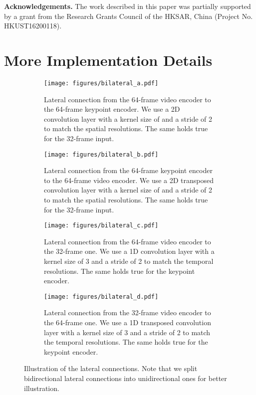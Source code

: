 \documentclass[10pt,twocolumn,letterpaper]{article}
\begin{document}
\small\noindent \textbf{Acknowledgements.}
The work described in this paper was partially supported by a grant from the Research Grants Council of the HKSAR, China (Project No. HKUST16200118). 
{\small


}

\appendix
\section{More Implementation Details}
\begin{figure*}[t]
    \centering
    \begin{subfigure}[b]{0.45\textwidth}
     \centering
     \texttt{[image: figures/bilateral\_a.pdf]}
     \caption{Lateral connection from the 64-frame video encoder to the 64-frame keypoint encoder. We use a 2D convolution layer with a kernel size of  and a stride of 2 to match the spatial resolutions. The same holds true for the 32-frame input.}
     \label{fig:bilat_A}
    \end{subfigure}
    \quad\quad
    \begin{subfigure}[b]{0.45\textwidth}
     \centering
     \texttt{[image: figures/bilateral\_b.pdf]}
     \caption{Lateral connection from the 64-frame keypoint encoder to the 64-frame video encoder. We use a 2D transposed convolution layer with a kernel size of  and a stride of 2 to match the spatial resolutions. The same holds true for the 32-frame input.}
     \label{fig:bilat_B}
    \end{subfigure}
    
    \begin{subfigure}[b]{0.45\textwidth}
     \centering
     \texttt{[image: figures/bilateral\_c.pdf]}
     \caption{Lateral connection from the 64-frame video encoder to the 32-frame one. We use a 1D convolution layer with a kernel size of 3 and a stride of 2 to match the temporal resolutions. The same holds true for the keypoint encoder.}
     \label{fig:bilat_C}
    \end{subfigure}
    \quad\quad
    \begin{subfigure}[b]{0.45\textwidth}
     \centering
     \texttt{[image: figures/bilateral\_d.pdf]}
     \caption{Lateral connection from the 32-frame video encoder to the 64-frame one. We use a 1D transposed convolution layer with a kernel size of 3 and a stride of 2 to match the temporal resolutions. The same holds true for the keypoint encoder.}
     \label{fig:bilat_D}
    \end{subfigure}

    \caption{Illustration of the lateral connections. Note that we split bidirectional lateral connections into unidirectional ones for better illustration.}
    \label{fig:bilat}
\end{figure*}
\end{document}
